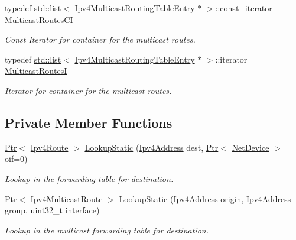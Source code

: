 \begin{DoxyCompactItemize}
typedef \hyperlink{openflow-interface_8h_afd9bcfa176617760671b67580f536fa7}{std\+::list}$<$ \hyperlink{classns3_1_1Ipv4MulticastRoutingTableEntry}{Ipv4\+Multicast\+Routing\+Table\+Entry} $\ast$ $>$\+::const\+\_\+iterator \hyperlink{classns3_1_1Ipv4StaticRouting_a8edf8cf21421add8ab26b5120797f21f}{Multicast\+Routes\+CI}
\begin{DoxyCompactList}\small\item\em Const Iterator for container for the multicast routes. \end{DoxyCompactList}\item 
typedef \hyperlink{openflow-interface_8h_afd9bcfa176617760671b67580f536fa7}{std\+::list}$<$ \hyperlink{classns3_1_1Ipv4MulticastRoutingTableEntry}{Ipv4\+Multicast\+Routing\+Table\+Entry} $\ast$ $>$\+::iterator \hyperlink{classns3_1_1Ipv4StaticRouting_ac832d5465e0c8f5dd30c6d024c2a2234}{Multicast\+RoutesI}
\begin{DoxyCompactList}\small\item\em Iterator for container for the multicast routes. \end{DoxyCompactList}\end{DoxyCompactItemize}
\subsection*{Private Member Functions}
\begin{DoxyCompactItemize}
\item 
\hyperlink{classns3_1_1Ptr}{Ptr}$<$ \hyperlink{classns3_1_1Ipv4Route}{Ipv4\+Route} $>$ \hyperlink{classns3_1_1Ipv4StaticRouting_a9ee2a4c5597e9b238369ba3667121852}{Lookup\+Static} (\hyperlink{classns3_1_1Ipv4Address}{Ipv4\+Address} dest, \hyperlink{classns3_1_1Ptr}{Ptr}$<$ \hyperlink{classns3_1_1NetDevice}{Net\+Device} $>$ oif=0)
\begin{DoxyCompactList}\small\item\em Lookup in the forwarding table for destination. \end{DoxyCompactList}\item 
\hyperlink{classns3_1_1Ptr}{Ptr}$<$ \hyperlink{classns3_1_1Ipv4MulticastRoute}{Ipv4\+Multicast\+Route} $>$ \hyperlink{classns3_1_1Ipv4StaticRouting_acc26ca2e9144cec5748e51d07edf7088}{Lookup\+Static} (\hyperlink{classns3_1_1Ipv4Address}{Ipv4\+Address} origin, \hyperlink{classns3_1_1Ipv4Address}{Ipv4\+Address} group, uint32\+\_\+t interface)
\begin{DoxyCompactList}\small\item\em Lookup in the multicast forwarding table for destination. \end{DoxyCompactList}\end{DoxyCompactItemize}
